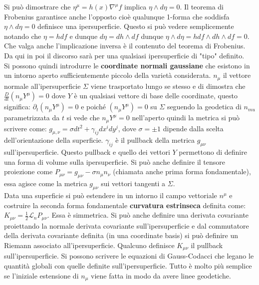 \documentclass[10pt,a4paper]{article}
\begin{document}
Si può dimostrare che $\eta^{\mu} = h(x) \nabla^{\mu} f$ implica $\eta \wedge d \eta = 0$. Il teorema di Frobenius garantisce anche l'opposto cioè qualunque 1-forma che soddisfa  $\eta \wedge d \eta = 0$ definisce una ipersuperficie. Questo si può vedere semplicemente notando che $\eta = h df$ e dunque $d \eta = dh \wedge df$ dunque $ \eta \wedge d \eta = h df \wedge dh \wedge df = 0$. Che valga anche l'implicazione inversa è il contenuto del teorema di Frobenius.\\
Da qui in poi il discorso sarà per una qualsiasi ipersuperficie di "tipo" definito.\\ 
Si possono quindi introdurre le \textbf{coordinate normali gaussiane} che esistono in un intorno aperto sufficientemente piccolo della varietà considerata. $n_{\mu}$ il vettore normale all'ipersuperficie $\Sigma$ viene trasportato lungo se stesso e di dimostra che $\frac{D}{d t}(n_{\mu} Y^{\mu}) = 0$ dove $Y$ è un qualsiasi vettore di base delle coordinate, questo significa: $\partial_{t} (n_{\mu} Y^{\mu}) = 0$ e poiché $(n_{\mu} Y^{\mu}) = 0$ su $\Sigma$ seguendo la geodetica di $n_{mu}$ parametrizzata da $t$ si vede che $n_{\mu} Y^{\mu} = 0$ nell'aperto quindi la metrica si può scrivere come:
$g_{\mu, \nu} = \sigma dt^2+\gamma_{i j} dx^i dy^j$, dove $\sigma = \pm 1$ dipende dalla scelta dell'orientazione della superficie. $\gamma_{i j}$ è il pullback della metrica $g_{\mu \nu}$ sull'ipersuperficie. Questo pullback e quello dei vettori ${Y}$ permettono di definire una forma di volume sulla ipersuperficie. Si può anche definire il tensore proiezione come $P_{\mu \nu} = g_{\mu \nu} - \sigma n_{\mu} n_{\nu}$ (chiamata anche prima forma fondamentale), essa agisce come la metrica $g_{\mu \nu}$ sui vettori tangenti a $\Sigma$.\\
Data una superficie si può estendere in un intorno il campo vettoriale $n^{\mu}$ e costruire la seconda forma fondamentale \textbf{curvatura estrinseca} definita come: $K_{\mu \nu} = \frac{1}{2} \mathcal{L}_{n} P_{\mu \nu}$. Essa è simmetrica. Si può anche definire una derivata covariante proiettando la normale derivata covariante sull'ipersuperficie e dal commutatore della derivata covariante definita (in una coordinate basis) si può definire un Riemann associato all'ipersuperficie. Qualcuno definisce $K_{\mu \nu}$ il pullback sull'ipersuperficie. Si possono scrivere le equazioni di Gauss-Codacci che legano le quantità globali con quelle definite sull'ipersuperficie. Tutto è molto più semplice se l'iniziale estensione di $n_{\mu}$ viene fatta in modo da avere linee geodetiche.\\
\end{document}
